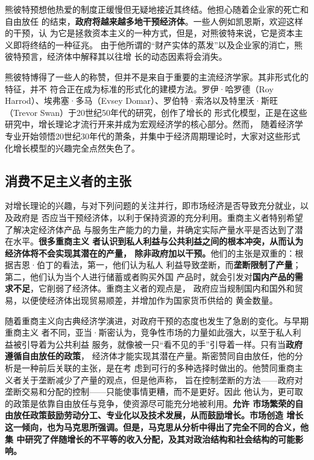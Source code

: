 熊彼特预想他热爱的制度正缓慢但无疑地接近其终结。他担心随着企业家的死亡和自由放任
的结束，\textbf{政府将越来越多地干预经济体}。一些人例如凯恩斯，欢迎这样的干预，认
为它是拯救资本主义的一种方式，但是，对熊彼特来说，它是资本主义即将终结的一种征兆。
由于他所谓的“财产实体的蒸发”以及企业家的消亡，熊彼特预言，经济体中解释其以往增
长的动态因素将会消失。

熊彼特博得了一些人的称赞，但并不是来自于重要的主流经济学家。其非形式化的特征，并不
符合正在成为标准的形式化的建模方法。罗伊·哈罗德（Roy Harrod）、埃弗塞·多马（Evsey
Domar）、罗伯特·索洛以及特里沃·斯旺（Trevor Swan）于20世纪50年代的研究，创作了增长的
形式化模型，正是在这些研究中，增长理论才流行开来并成为宏观经济学的核心部分。然而，
随着经济学专业开始领悟20世纪30年代的萧条，并集中于经济周期理论时，大家对这些形式
化增长模型的兴趣完全点然失色了。

\subsection{消费不足主义者的主张}

对增长理论的兴趣，与对下列问题的关注并行，即市场经济是否导致充分就业，以及政府是
否应当干预经济体，以利于保持资源的充分利用。重商主义者特别希望了解决定经济体产品
与服务生产能力的力量，并确定实际产量水平是否达到了潜在水平。\textbf{很多重商主义
  者认识到私人利益与公共利益之间的根本冲突，从而认为经济体将不会实现其潜在的产量，
  除非政府加以干预。}他们的主张是双重的：根据吉恩·伯丁的看法，第一，他们认为私人
利益导致垄断，而\textbf{垄断限制了产量}；第二，他们认为当个人进行储蓄或者购买外国
产品时，就会引发对\textbf{国内产品的需求不足}，它削弱了经济体。重商主义者的观点是，
政府应当规制国内和国外和贸易，以便使经济体出现贸易顺差，并增加作为国家货币供给的
黄金数量。

随着重商主义向古典经济学演进，对政府干预的态度也发生了急剧的变化。与早期重商主义
者不同，亚当·斯密认为，竞争性市场的力量如此强大，以至于私人利益被引导着为公共利益
服务，就像被一只“看不见的手”引导着一样。只有当\textbf{政府遵循自由放任的政策}，
经济体才能实现其潜在产量。斯密赞同自由放任，他的分析是一种前后关联的主张，是在考
虑到可行的多种选择时做出的。他赞同重商主义者关于垄断减少了产量的观点，但是他声称，
旨在控制垄断的方法——政府对垄断交易和分配的控制——只能使事情更糟，而不是更好。因此
他认为，更可取的政策是依靠自由放任与竞争，使资源尽可能充分地被利用。\textbf{允许
  市场繁荣的自由放任政策鼓励劳动分工、专业化以及技术发展，从而鼓励增长。市场创造
  增长这一倾向，也为马克思所强调。但是，马克思从分析中得出了完全不同的合义，他集
  中研究了伴随增长的不平等的收入分配，及其对政治结构和社会结构的可能影响。}

